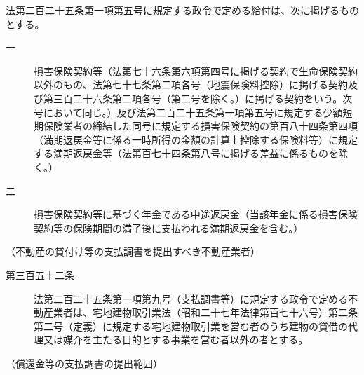 \documentclass[twocolumn,a4j,10pt]{ltjtarticle}
\begin{document}
\begin{description}
\begin{description}
\end{description}
\item[\rensuji{2}]法第二百二十五条第一項第五号に規定する政令で定める給付は、次に掲げるものとする。
\begin{description}
\item[一]損害保険契約等（法第七十六条第六項第四号に掲げる契約で生命保険契約以外のもの、法第七十七条第二項各号（地震保険料控除）に掲げる契約及び第三百二十六条第二項各号（第二号を除く。）に掲げる契約をいう。次号において同じ。）及び法第二百二十五条第一項第五号に規定する少額短期保険業者の締結した同号に規定する損害保険契約の第百八十四条第四項（満期返戻金等に係る一時所得の金額の計算上控除する保険料等）に規定する満期返戻金等（法第百七十四条第八号に掲げる差益に係るものを除く。）
\item[二]損害保険契約等に基づく年金である中途返戻金（当該年金に係る損害保険契約等の保険期間の満了後に支払われる満期返戻金を含む。）
\end{description}
\end{description}
\noindent\hspace{10pt}（不動産の貸付け等の支払調書を提出すべき不動産業者）
\begin{description}
\item[第三百五十二条]法第二百二十五条第一項第九号（支払調書等）に規定する政令で定める不動産業者は、宅地建物取引業法（昭和二十七年法律第百七十六号）第二条第二号（定義）に規定する宅地建物取引業を営む者のうち建物の貸借の代理又は媒介を主たる目的とする事業を営む者以外の者とする。
\end{description}
\noindent\hspace{10pt}（償還金等の支払調書の提出範囲）
\end{document}

